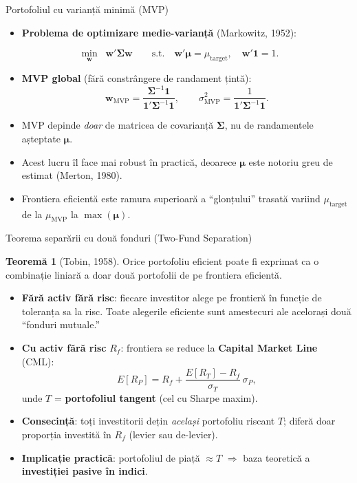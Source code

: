 \documentclass[9pt, aspectratio=169, t]{beamer}
\theoremstyle{definition}
\newtheorem{thm}{Teoremă}
\begin{document}
\begin{frame}{Portofoliul cu varianță minimă (MVP)}
\begin{itemize}
    \item \textbf{Problema de optimizare medie-varianță} (Markowitz, 1952):
\end{itemize}
\[
\min_{\mathbf{w}} \;\; \mathbf{w}'\boldsymbol{\Sigma}\mathbf{w} \qquad \text{s.t.} \quad \mathbf{w}'\boldsymbol{\mu} = \mu_{\text{target}}, \quad \mathbf{w}'\mathbf{1} = 1.
\]
\begin{itemize}
    \item \textbf{MVP global} (fără constrângere de randament țintă):
    \[
    \mathbf{w}_{\text{MVP}} = \frac{\boldsymbol{\Sigma}^{-1}\mathbf{1}}{\mathbf{1}'\boldsymbol{\Sigma}^{-1}\mathbf{1}}, \qquad \sigma_{\text{MVP}}^2 = \frac{1}{\mathbf{1}'\boldsymbol{\Sigma}^{-1}\mathbf{1}}.
    \]
    \item MVP depinde \textit{doar} de matricea de covarianță $\boldsymbol{\Sigma}$, nu de randamentele așteptate $\boldsymbol{\mu}$.
    \item Acest lucru îl face mai robust în practică, deoarece $\boldsymbol{\mu}$ este notoriu greu de estimat (Merton, 1980).
    \item Frontiera eficientă este ramura superioară a ``glonțului'' trasată variind $\mu_{\text{target}}$ de la $\mu_{\text{MVP}}$ la $\max(\boldsymbol{\mu})$.
\end{itemize}
\end{frame}

\begin{frame}{Teorema separării cu două fonduri (Two-Fund Separation)}
\begin{thm}[Tobin, 1958]
Orice portofoliu eficient poate fi exprimat ca o combinație liniară a doar două portofolii de pe frontiera eficientă.
\end{thm}
\vspace{0.1cm}
\begin{itemize}
    \item \textbf{Fără activ fără risc}: fiecare investitor alege pe frontieră în funcție de toleranța sa la risc. Toate alegerile eficiente sunt amestecuri ale acelorași două ``fonduri mutuale.''
    \item \textbf{Cu activ fără risc} $R_f$: frontiera se reduce la \textbf{Capital Market Line} (CML):
    \[
    E[R_P] = R_f + \frac{E[R_T] - R_f}{\sigma_T}\,\sigma_P,
    \]
    unde $T$ = \textbf{portofoliul tangent} (cel cu Sharpe maxim).
    \item \textbf{Consecință}: toți investitorii dețin \textit{același} portofoliu riscant $T$; diferă doar proporția investită în $R_f$ (levier sau de-levier).
    \item \textbf{Implicație practică}: portofoliul de piață $\approx T$ $\Rightarrow$ baza teoretică a \textbf{investiției pasive în indici}.
\end{itemize}
\end{frame}
\end{document}

